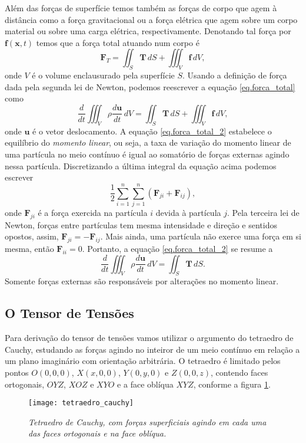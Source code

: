 Al\'em das for\c{c}as de superf\'icie temos tamb\'em as for\c{c}as de corpo que agem \`a dist\^ancia como a for\c{c}a gravitacional ou a for\c{c}a el\'etrica que agem sobre um corpo material ou sobre uma carga el\'etrica, respectivamente. Denotando tal for\c{c}a por $\mathbf{f}(\mathbf{x},t)$ temos que a for\c{c}a total atuando num corpo \'e
\begin{equation}\label{eq.forca_total}
\mathbf{F}_T=\iint_S\mathbf{T}\,dS+\iiint_V\mathbf{f}\,dV,
\end{equation}
onde $V$ \'e o volume enclausurado pela superf\'icie $S$. Usando a defini\c{c}\~ao de for\c{c}a dada pela segunda lei de Newton, podemos reescrever a equa\c{c}\~ao \ref{eq.forca_total} como
\begin{equation}\label{eq.forca_total_2}
\frac{d}{dt}\iiint_V\rho\frac{d\mathbf{u}}{dt}\,dV=\iint_S\mathbf{T}\,dS+\iiint_V\mathbf{f}\,dV,
\end{equation}
onde $\mathbf{u}$ \'e o vetor deslocamento. A equa\c{c}\~ao \ref{eq.forca_total_2} estabelece o equil\'ibrio do \textit{momento linear}, ou seja, a taxa de varia\c{c}\~ao do momento linear de uma part\'icula no meio cont\'inuo \'e igual ao somat\'orio de for\c{c}as externas agindo nessa part\'icula. Discretizando a \'ultima integral da equa\c{c}\~ao acima podemos escrever
\begin{equation*}
\frac{1}{2}\sum_{i=1}^n\sum_{j=1}^n(\mathbf{F}_{ji}+\mathbf{F}_{ij}),
\end{equation*}
onde $\mathbf{F}_{ji}$ \'e a for\c{c}a exercida na part\'icula $i$ devida \`a part\'icula $j$. Pela terceira lei de Newton, for\c{c}as entre part\'iculas tem mesma intensidade e dire\c{c}\~ao e sentidos opostos, assim, $\mathbf{F}_{ji}=-\mathbf{F}_{ij}$. Mais ainda, uma part\'icula n\~ao exerce uma for\c{c}a em si mesma, ent\~ao $\mathbf{F}_{ii}=0$. Portanto, a equa\c{c}\~ao \ref{eq.forca_total_2} se resume a
\begin{equation*}
\frac{d}{dt}\iiint_V\rho\frac{d\mathbf{u}}{dt}\,dV=\iint_S\mathbf{T}\,dS.
\end{equation*}
Somente for\c{c}as externas s\~ao respons\'aveis por altera\c{c}\~oes no momento linear.

\subsection{O Tensor de Tens\~oes}\label{sec.tensor_tensoes}

Para deriva\c{c}\~ao do tensor de tens\~oes vamos utilizar o argumento do tetraedro de Cauchy, estudando as for\c{c}as agindo no inteiror de um meio cont\'inuo em rela\c{c}\~ao a um plano imagin\'ario com orienta\c{c}\~ao arbitr\'aria. O tetraedro \'e limitado pelos pontos $O(0,0,0)$, $X(x,0,0)$, $Y(0,y,0)$ e $Z(0,0,z)$, contendo faces ortogonais, $OYZ$, $XOZ$ e $XYO$ e a face obl\'iqua $XYZ$, conforme a figura \ref{fig.tetraedro}.
\begin{figure}
\centering
\texttt{[image: tetraedro\_cauchy]}
\caption{\textit{Tetraedro de Cauchy, com for\c{c}as superficiais agindo em cada uma das faces ortogonais e na face obl\'iqua.}}
\label{fig.tetraedro}
\end{figure}


